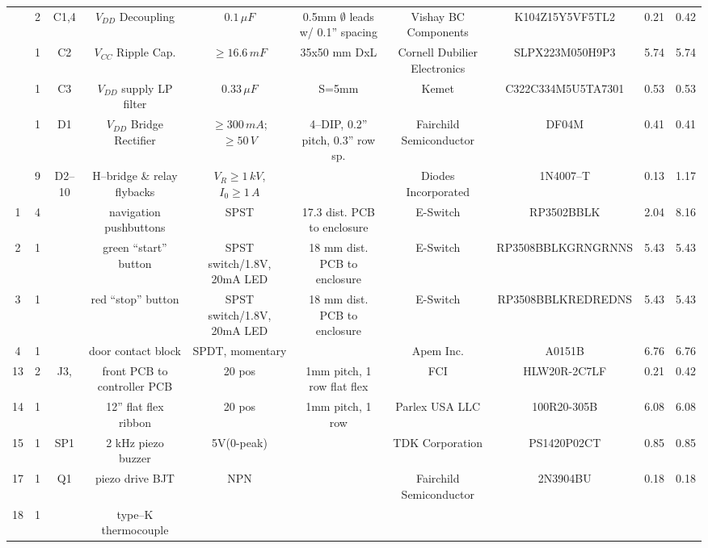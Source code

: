 \documentclass[10pt, twocolumn]{article}
\begin{document}
\begin{center}
\begin{adjustbox}{max width=\textwidth}
\begin{tabular}{c c c c c c c c c c}
	&2	&C1,4		&$V_{DD}$ Decoupling	&$0.1\,\mu F$	&0.5mm $\emptyset$ leads w/ 0.1'' spacing
	&Vishay BC Components	&K104Z15Y5VF5TL2	&0.21		&0.42		\\

	&1	&C2		&$V_{CC}$ Ripple Cap.	&$\geq16.6\,mF$	&35x50 mm DxL		
	&Cornell Dubilier Electronics	&SLPX223M050H9P3	&5.74		&5.74	\\

	&1	&C3		&$V_{DD}$ supply LP filter	&$0.33\,\mu F$	&S=5mm		
	&Kemet			&C322C334M5U5TA7301	&0.53		&0.53		\\

	&1	&D1		&$V_{DD}$ Bridge Rectifier	&$\geq 300\,mA$; $\geq 50\,V$	&4--DIP, 0.2'' pitch, 0.3'' row sp.
	&Fairchild Semiconductor	&DF04M			&0.41		&0.41	\\

	&9	&D2--10	&H--bridge \& relay flybacks	&$V_{R}\geq1\,kV$, $I_{0}\geq 1\,A$	&
	&Diodes Incorporated	&1N4007--T		&0.13		&1.17	\\

1	&4	&	&navigation pushbuttons	&SPST				&17.3 dist. PCB to enclosure
	&E-Switch		&RP3502BBLK		&2.04		&8.16	\\

2	&1	&	&green “start” button	&SPST switch/1.8V, 20mA LED	&18 mm dist. PCB to enclosure
	&E-Switch		&RP3508BBLKGRNGRNNS	&5.43		&5.43	\\

3	&1	&	&red “stop” button	&SPST switch/1.8V, 20mA LED	&18 mm dist. PCB to enclosure
	&E-Switch		&RP3508BBLKREDREDNS	&5.43		&5.43	\\

4	&1	&	&door contact block	&SPDT, momentary		&
	&Apem Inc.		&A0151B			&6.76		&6.76	\\

13	&2	&J3,	&front PCB to controller PCB	&20 pos			&1mm pitch, 1 row flat flex
	&FCI			&HLW20R-2C7LF		&0.21		&0.42	\\

14	&1	&	&12” flat flex ribbon		&20 pos		&1mm pitch, 1 row
	&Parlex USA LLC		&100R20-305B		&6.08		&6.08	\\

15	&1	&SP1	&2 kHz piezo buzzer	&5V(0-peak)			&
	&TDK Corporation	&PS1420P02CT		&0.85		&0.85	\\

17	&1	&Q1	&piezo drive BJT		&NPN				&
	&Fairchild Semiconductor	&2N3904BU	&0.18		&0.18	\\

18	&1	&	&type--K thermocouple	&				&
	&			&			&		&	\\


\end{tabular}
\end{adjustbox}
\end{center}
\end{document}
